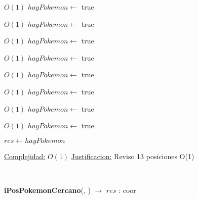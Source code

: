 \begin{Algoritmos}
\begin{algorithmic}[1]
         \Comment $O(1)$
        \State $hayPokemon \gets$ true
    \EndIf


             \Comment $O(1)$
            \State $hayPokemon \gets$ true
        \EndIf

    \EndIf

\EndIf


         \Comment $O(1)$
        \State $hayPokemon \gets$ true
    \EndIf


             \Comment $O(1)$
            \State $hayPokemon \gets$ true
        \EndIf


    \EndIf

\EndIf

         \Comment $O(1)$
        \State $hayPokemon \gets$ true
        \EndIf

             \Comment $O(1)$
            \State $hayPokemon \gets$ true
        \EndIf
    \EndIf

             \Comment $O(1)$
            \State $hayPokemon \gets$ true
        \EndIf

    \EndIf
\EndIf

         \Comment $O(1)$
        \State $hayPokemon \gets$ true
    \EndIf
\EndIf

\State $res \gets hayPokemon$

\medskip
\State \underline{Complejidad:} $O(1)$ %
\State \underline{Justificacion:} Reviso 13 posiciones O(1)

\end{algorithmic}

$ $\newline
$ $\newline
$ $\newline



{\textbf{iPosPokemonCercano}(, ) $\to$ $res$ : coor}
\begin{algorithmic}[1]


\end{algorithmic}
\end{Algoritmos}

